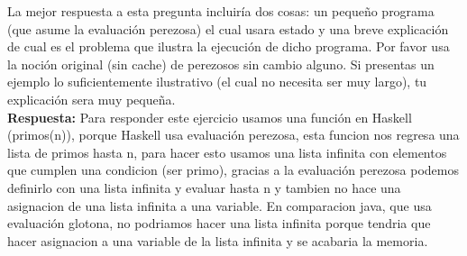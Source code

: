 \documentclass{article}
\begin{document}
La mejor respuesta a esta pregunta incluiría dos cosas: un pequeño programa (que
asume la evaluación perezosa) el cual usara estado y una breve explicación de cual
es el problema que ilustra la ejecución de dicho programa. Por favor usa la
noción original (sin cache) de perezosos sin cambio alguno. Si presentas un
ejemplo lo suficientemente ilustrativo (el cual no necesita ser muy largo), tu
explicación sera muy pequeña.
\\

\textbf{Respuesta: }
Para responder este ejercicio usamos una función en Haskell (primos(n)), porque Haskell usa evaluación perezosa, esta funcion nos regresa una lista de primos hasta n, para hacer esto usamos una lista infinita con elementos que cumplen una condicion (ser primo), gracias a la evaluación perezosa podemos definirlo con una lista infinita y evaluar hasta n y tambien no hace una asignacion de una lista infinita a una variable. En comparacion java, que usa evaluación glotona, no podriamos hacer una lista infinita porque tendria que hacer asignacion a una variable de la lista infinita y se acabaria la memoria.
\end{document}
